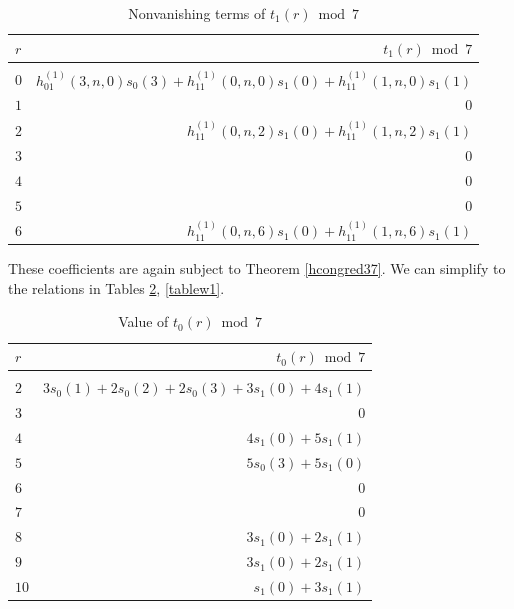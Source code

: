 \documentclass[reqno]{amsart}
\theoremstyle{definition}
\theoremstyle{remark}
\numberwithin{equation}{section}
\begin{document}
\begin{table}[hbt!]
\begin{center}
\begin{tabular}{l|r}
 $r$      & $t_1(r)\bmod 7$\\
\hline\\
 $0$         & $h^{(1)}_{01}(3,n,0)s_0(3)+h^{(1)}_{11}(0,n,0)s_1(0)+h^{(1)}_{11}(1,n,0)s_1(1)$\\
 $1$         & $0$\\
 $2$         & $h^{(1)}_{11}(0,n,2)s_1(0)+h^{(1)}_{11}(1,n,2)s_1(1)$\\
 $3$         & $0$\\
 $4$         & $0$\\
 $5$         & $0$\\
 $6$         & $h^{(1)}_{11}(0,n,6)s_1(0)+h^{(1)}_{11}(1,n,6)s_1(1)$
 \end{tabular}
\vspace{0.2 cm}
\caption{Nonvanishing terms of $t_1(r)\bmod 7$}\label{tablew11}
\end{center}
\end{table}  These coefficients are again subject to Theorem \ref{hcongred37}.  We can simplify to the relations in Tables \ref{tablew0}, \ref{tablew1}.

\begin{table}[hbt!]
\begin{center}
\begin{tabular}{l|r}
 $r$      & $t_0(r)\bmod 7$\\
\hline\\
 $2$         & $3s_0(1)+2s_0(2)+2s_0(3)+3s_1(0)+4s_1(1)$\\
 $3$         & $0$\\
 $4$         & $4s_1(0)+5s_1(1)$\\
 $5$         & $5s_0(3)+5s_1(0)$\\
 $6$         & $0$\\
 $7$         & $0$\\
 $8$         & $3s_1(0)+2s_1(1)$\\
 $9$         & $3s_1(0)+2s_1(1)$\\
 $10$       & $s_1(0)+3s_1(1)$
 \end{tabular}
\vspace{0.2 cm}
\caption{Value of $t_0(r)\bmod 7$}\label{tablew0}
\end{center}
\end{table}
\end{document}

